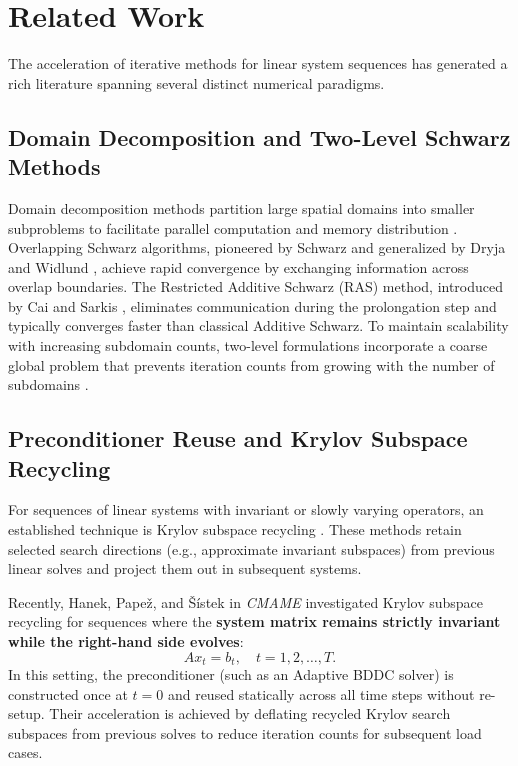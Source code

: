 \documentclass[preprint,12pt,3p]{elsarticle}
\begin{document}
\section{Related Work}
\label{sec:related_work}

The acceleration of iterative methods for linear system sequences has generated a rich literature spanning several distinct numerical paradigms.

\subsection{Domain Decomposition and Two-Level Schwarz Methods}
Domain decomposition methods partition large spatial domains into smaller subproblems to facilitate parallel computation and memory distribution \cite{toselli2005domain, doval2008domain}. Overlapping Schwarz algorithms, pioneered by Schwarz \cite{schwarz1870ueber} and generalized by Dryja and Widlund \cite{dryja1994domain}, achieve rapid convergence by exchanging information across overlap boundaries. The Restricted Additive Schwarz (RAS) method, introduced by Cai and Sarkis \cite{cai1999restricted}, eliminates communication during the prolongation step and typically converges faster than classical Additive Schwarz. To maintain scalability with increasing subdomain counts, two-level formulations incorporate a coarse global problem that prevents iteration counts from growing with the number of subdomains \cite{smith1996domain, toth2012two}.

\subsection{Preconditioner Reuse and Krylov Subspace Recycling}
For sequences of linear systems with invariant or slowly varying operators, an established technique is Krylov subspace recycling \cite{parks2006recycling, kilmer2006recycling}. These methods retain selected search directions (e.g., approximate invariant subspaces) from previous linear solves and project them out in subsequent systems. 

Recently, Hanek, Pape\v{z}, and \v{S}\'{i}stek \cite{hanek2026recycling} in \textit{CMAME} investigated Krylov subspace recycling for sequences where the \textbf{system matrix remains strictly invariant while the right-hand side evolves}:
\begin{equation}
A x_t = b_t, \quad t = 1, 2, \dots, T.
\label{eq:invariant_matrix}
\end{equation}
In this setting, the preconditioner (such as an Adaptive BDDC solver) is constructed once at $t=0$ and reused statically across all time steps without re-setup. Their acceleration is achieved by deflating recycled Krylov search subspaces from previous solves to reduce iteration counts for subsequent load cases.
\end{document}
